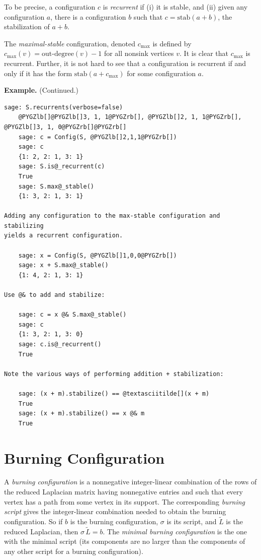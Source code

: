 \documentclass[letterpaper,10pt,english]{manual}
\begin{document}
To be precise, a configuration $c$ is \emph{recurrent} if (i) it is stable, and (ii)
given any configuration $a$, there is a configuration $b$ such that
$c=\mbox{stab}(a+b)$, the stabilization of $a+b$.

The \emph{maximal-stable} configuration, denoted $c_{\mathrm{max}}$ is defined by
$c_{\mathrm{max}}(v)=\mbox{out-degree}(v)-1$ for all nonsink vertices $v$.  It is clear that $c_{\mathrm{max}}$ is recurrent.  Further, it is not hard to see that a configuration is recurrent if and only if it has the form $\mbox{stab}(a+c_{\mathrm{max}})$ for some configuration $a$.

\textbf{Example.} (Continued.)

\begin{Verbatim}[commandchars=@\[\]]
    sage: S.recurrents(verbose=false)
    @PYGZlb[]@PYGZlb[]3, 1, 1@PYGZrb[], @PYGZlb[]2, 1, 1@PYGZrb[], @PYGZlb[]3, 1, 0@PYGZrb[]@PYGZrb[]
    sage: c = Config(S, @PYGZlb[]2,1,1@PYGZrb[])
    sage: c
    {1: 2, 2: 1, 3: 1}
    sage: S.is@_recurrent(c)
    True
    sage: S.max@_stable()
    {1: 3, 2: 1, 3: 1}

Adding any configuration to the max-stable configuration and stabilizing
yields a recurrent configuration.

    sage: x = Config(S, @PYGZlb[]1,0,0@PYGZrb[])
    sage: x + S.max@_stable()
    {1: 4, 2: 1, 3: 1}

Use @& to add and stabilize:

    sage: c = x @& S.max@_stable()
    sage: c
    {1: 3, 2: 1, 3: 0}
    sage: c.is@_recurrent()
    True

Note the various ways of performing addition + stabilization:

    sage: (x + m).stabilize() == @textasciitilde[](x + m)
    True
    sage: (x + m).stabilize() == x @& m
    True
\end{Verbatim}


\section{Burning Configuration}

A \emph{burning configuration} is a nonnegative integer-linear combination of the
rows of the reduced Laplacian matrix having nonnegative entries and such that
every vertex has a path from some vertex in its support.  The corresponding
\emph{burning script} gives the integer-linear combination needed to obtain the
burning configuration.  So if $b$ is the burning configuration, $\sigma$ is its
script, and $\tilde{L}$ is the reduced Laplacian, then $\sigma\,\tilde{L} = b$.
The \emph{minimal burning configuration} is the one with the minimal script (its
components are no larger than the components of any other script for a burning
configuration).
\end{document}
